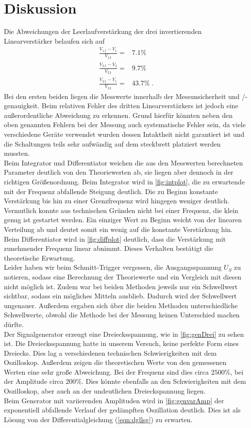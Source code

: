 \section{Diskussion}
\label{sec:Diskussion}
Die Abweichungen der Leerlaufverstärkung der drei invertierenden Linearverstärker belaufen sich auf 
\begin{align*}
    \frac{V_{1\text{,t}}-V_1}{V_{1\text{,t}}}=&7.1\%\\
    \frac{V_{2\text{,t}}-V_2}{V_{2\text{,t}}}=&9.7\%\\
    \frac{V_{3\text{,t}}-V_1}{V_{3\text{,t}}}=&43.7\%\; .
\end{align*}
Bei den ersten beiden liegen die Messwerte innerhalb der Messunsicherheit und /-genauigkeit. Beim relativen Fehler des dritten Linearverstärkers ist jedoch eine außerordentliche Abweichung zu erkennen.
Grund hierfür könnten neben den oben genannten Fehlern bei der Messung auch systematische Fehler sein, da viele verschiedene Geräte verwendet wurden dessen Intaktheit nicht garantiert ist und die Schaltungen teils sehr aufwändig 
auf dem steckbrett platziert werden mussten.
\\
Beim Integrator und Differentiator weichen die aus den Messwerten berechneten Parameter deutlich von den Theoriewerten ab, sie liegen aber dennoch 
in der richtigen Größenordnung. Beim Integrator wird in \autoref{fig:intplot}, die zu erwartende mit der Frequenz abfallende Steigung deutlich. 
Die zu Beginn konstante Verstärkung bis hin zu einer Grenzfrequenz wird hingegen weniger deutlich. Vermutlich konnte aus technischen Gründen nicht 
bei einer Frequenz, die klein genug ist gestartet werden. Ein einziger Wert zu Beginn weicht von der linearen Verteilung ab und deutet somit ein 
wenig auf die konstante Verstärkung hin. Beim Differentiator wird in \autoref{fig:diffplot} deutlich, dass die Verstärkung mit zunehmender Frequenz linear 
abnimmt. Dieses Verhalten bestätigt die theoretische Erwartung.
\\
Leider haben wir beim Schmitt-Trigger vergessen, die Ausgangsspannung $U_S$ zu notieren, sodass eine Berechnung der Theoriewerte und ein Vergleich mit 
diesen nicht möglich ist. Zudem war bei beiden Methoden jeweils nur ein Schwellwert sichtbar, sodass ein mögliches Mitteln ausblieb. Dadurch wird 
der Schwellwert ungenauer. Außerdem ergaben sich über die beiden Methoden unterschiedliche Schwellwerte, obwohl die Methode bei der Messung 
keinen Unterschied machen dürfte.
\\
Der Signalgenerator erzeugt eine Dreiecksspannung, wie in \autoref{fig:genDrei} zu sehen ist. Die Dreiecksspannung hatte in unserem Versuch, 
keine perfekte Form eines Dreiecks. Dies lag a verschiedenen technischen Schwierigkeiten mit dem Oszilloskop. Außerdem zeigen die theoretischen Werte 
von den gemessenen Werten eine sehr große Abweichung. Bei der Frequenz sind dies circa $2500\%$, bei der Amplitude circa $200\%$. Dies könnte ebenfalls 
an den Schwierigkeiten mit dem Oszilloskop, aber auch an der undeutlichen Dreieckspannung liegen.
\\
Beim Generator mit variierenden Amplituden wird in \autoref{fig:genvarAmp} der exponentiell abfallende Verlauf der gedämpften Oszillation 
deutlich. Dies ist als Lösung von der Differentialgleichung (\autoref{eqn:dgllsg}) zu erwarten.